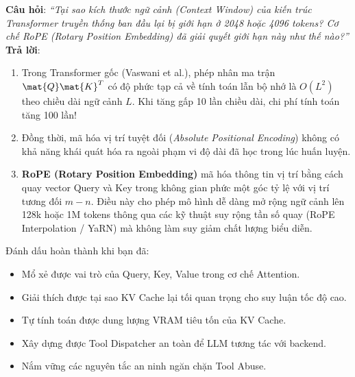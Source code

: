 \begin{interviewbox}
\textbf{Câu hỏi}: \textit{``Tại sao kích thước ngữ cảnh (Context Window) của kiến trúc Transformer truyền thống ban đầu lại bị giới hạn ở 2048 hoặc 4096 tokens? Cơ chế RoPE (Rotary Position Embedding) đã giải quyết giới hạn này như thế nào?''}\\
\textbf{Trả lời}:
\begin{enumerate}
  \item Trong Transformer gốc (Vaswani et al.), phép nhân ma trận $\mat{Q}\mat{K}^T$ có độ phức tạp cả về tính toán lẫn bộ nhớ là $O(L^2)$ theo chiều dài ngữ cảnh $L$. Khi tăng gấp 10 lần chiều dài, chi phí tính toán tăng 100 lần!
  \item Đồng thời, mã hóa vị trí tuyệt đối (\textit{Absolute Positional Encoding}) không có khả năng khái quát hóa ra ngoài phạm vi độ dài đã học trong lúc huấn luyện.
  \item \textbf{RoPE (Rotary Position Embedding)} mã hóa thông tin vị trí bằng cách quay vector Query và Key trong không gian phức một góc tỷ lệ với vị trí tương đối $m - n$. Điều này cho phép mô hình dễ dàng mở rộng ngữ cảnh lên 128k hoặc 1M tokens thông qua các kỹ thuật suy rộng tần số quay (RoPE Interpolation / YaRN) mà không làm suy giảm chất lượng biểu diễn.
\end{enumerate}
\end{interviewbox}

\begin{checkpointbox}
Đánh dấu hoàn thành khi bạn đã:
\begin{itemize}
  \item[$\square$] Mổ xẻ được vai trò của Query, Key, Value trong cơ chế Attention.
  \item[$\square$] Giải thích được tại sao KV Cache lại tối quan trọng cho suy luận tốc độ cao.
  \item[$\square$] Tự tính toán được dung lượng VRAM tiêu tốn của KV Cache.
  \item[$\square$] Xây dựng được Tool Dispatcher an toàn để LLM tương tác với backend.
  \item[$\square$] Nắm vững các nguyên tắc an ninh ngăn chặn Tool Abuse.
\end{itemize}
\end{checkpointbox}
